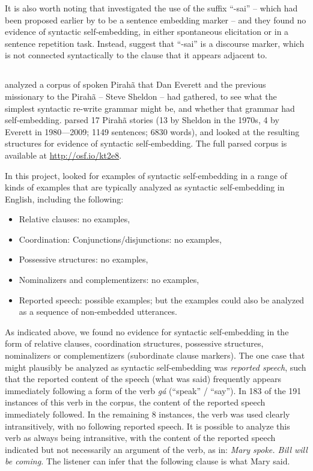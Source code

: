 \documentclass{article}
\begin{document}
It is also worth noting that \citet{sakel2010piraha} investigated the use of the suffix ``-sai'' -- which had been proposed earlier by \citet{everett1986piraha} to be a sentence embedding marker -- and they found no evidence of syntactic self-embedding, in either spontaneous elicitation or in a sentence repetition task. Instead, \citet{sakel2010piraha} suggest that ``-sai'' is a discourse marker, which is not connected syntactically to the clause that it appears adjacent to.

\subsection{}

\citet{futrell2016corpus} analyzed a corpus of spoken Pirahã that Dan Everett and the previous missionary to the Pirahã -- Steve Sheldon -- had gathered, to see what the simplest syntactic re-write grammar might be, and whether that grammar had self-embedding. \citet{futrell2016corpus} parsed 17 Pirahã stories (13 by Sheldon in the 1970s, 4 by Everett in 1980—2009; 1149 sentences; 6830 words), and looked at the resulting structures for evidence of syntactic self-embedding. The full parsed corpus is available at \url{http://osf.io/kt2e8}.

In this project, \citet{futrell2016corpus} looked for examples of syntactic self\hyp embedding in a range of kinds of examples that are typically analyzed as syntactic self-embedding in English, including the following:

\begin{itemize}
    \item Relative clauses: no examples,
    \item Coordination: Conjunctions/disjunctions: no examples, 
    \item Possessive structures: no examples,
    \item Nominalizers and complementizers: no examples,
    \item Reported speech: possible examples; but the examples could also be analyzed as a sequence of non-embedded utterances.
\end{itemize} 

As indicated above, we found no evidence for syntactic self-embedding in the form of relative clauses, coordination structures, possessive structures, nominalizers or complementizers (subordinate clause markers). The one case that might plausibly be analyzed as syntactic self-embedding was \textit{reported speech}, such that the reported content of the speech (what was said) frequently appears immediately following a form of the verb \textit{gá} (``speak'' / ``say''). In 183 of the 191 instances of this verb in the corpus, the content of the reported speech immediately followed. In the remaining 8 instances, the verb was used clearly intransitively, with no following reported speech. It is possible to analyze this verb as always being intransitive, with the content of the reported speech indicated but not necessarily an argument of the verb, as in:  \textit{Mary spoke.  Bill will be coming.}  The listener can infer that the following clause is what Mary said.  
\end{document}
